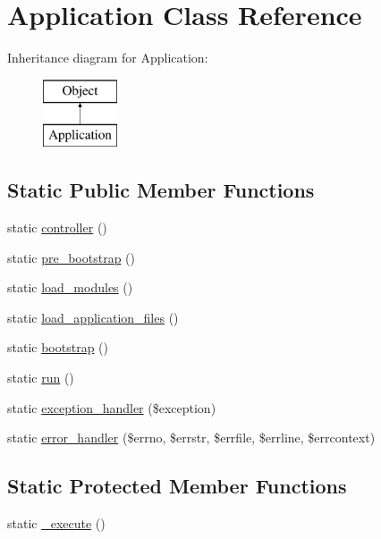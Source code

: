 \hypertarget{class_application}{
\section{Application Class Reference}
\label{class_application}
}
Inheritance diagram for Application:\begin{figure}[H]
\begin{center}
\leavevmode
\includegraphics[height=2.000000cm]{class_application}
\end{center}
\end{figure}
\subsection*{Static Public Member Functions}
\begin{DoxyCompactItemize}
\item 
static \hyperlink{class_application_ad79a780a0dc0d1a39276ff7eef4bb9e3}{controller} ()
\item 
static \hyperlink{class_application_a2ab7f7dbf9a7b36227d797809dd47ec0}{pre\_\-bootstrap} ()
\item 
static \hyperlink{class_application_a68b925f285a0ff30c36c1494907152d2}{load\_\-modules} ()
\item 
static \hyperlink{class_application_ae808594fd5dc6d3b8cf71ba10a21e94a}{load\_\-application\_\-files} ()
\item 
static \hyperlink{class_application_a73f9b330de6451728da16c8d2e18dba3}{bootstrap} ()
\item 
static \hyperlink{class_application_ad3a572002fd350672b531756f7306e8f}{run} ()
\item 
static \hyperlink{class_application_ab80413147ae5942946499c40feaaab9e}{exception\_\-handler} (\$exception)
\item 
static \hyperlink{class_application_a705a3b2cc157da9de137ff422ad4b8b1}{error\_\-handler} (\$errno, \$errstr, \$errfile, \$errline, \$errcontext)
\end{DoxyCompactItemize}
\subsection*{Static Protected Member Functions}
\begin{DoxyCompactItemize}
\item 
static \hyperlink{class_application_a6ac4f15b4f6a1c98eb2e38413279aee1}{\_\-execute} ()
\end{DoxyCompactItemize}
